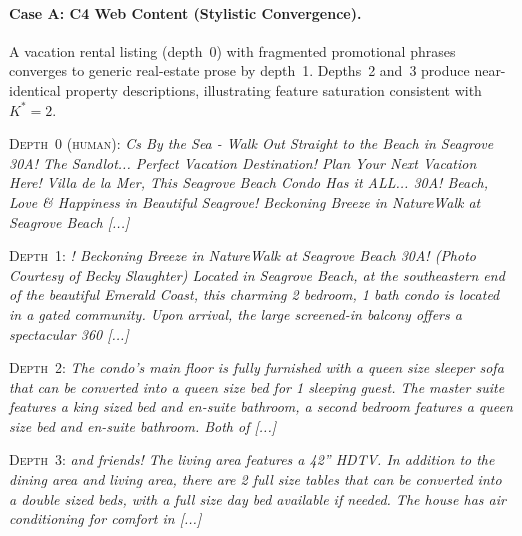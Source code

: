 \paragraph{Case A: C4 Web Content (Stylistic Convergence).}
A vacation rental listing (depth~0) with fragmented promotional phrases converges to generic real-estate prose by depth~1. Depths~2 and~3 produce near-identical property descriptions, illustrating feature saturation consistent with $K^*{=}2$.

\begin{center}
{\footnotesize
{}}
\end{center}

\noindent\textsc{Depth~0 (human):} {\small\itshape Cs By the Sea - Walk Out Straight to the Beach in Seagrove 30A! The Sandlot... Perfect Vacation Destination! Plan Your Next Vacation Here! Villa de la Mer, This Seagrove Beach Condo Has it ALL... 30A! Beach, Love \& Happiness in Beautiful Seagrove! Beckoning Breeze in NatureWalk at Seagrove Beach [...]}
\smallskip

\noindent\textsc{Depth~1:} {\small\itshape ! Beckoning Breeze in NatureWalk at Seagrove Beach 30A! (Photo Courtesy of Becky Slaughter) Located in Seagrove Beach, at the southeastern end of the beautiful Emerald Coast, this charming 2 bedroom, 1 bath condo is located in a gated community. Upon arrival, the large screened-in balcony offers a spectacular 360 [...]}
\smallskip

\noindent\textsc{Depth~2:} {\small\itshape The condo's main floor is fully furnished with a queen size sleeper sofa that can be converted into a queen size bed for 1 sleeping guest. The master suite features a king sized bed and en-suite bathroom, a second bedroom features a queen size bed and en-suite bathroom. Both of [...]}
\smallskip

\noindent\textsc{Depth~3:} {\small\itshape and friends! The living area features a 42'' HDTV. In addition to the dining area and living area, there are 2 full size tables that can be converted into a double sized beds, with a full size day bed available if needed. The house has air conditioning for comfort in [...]}

